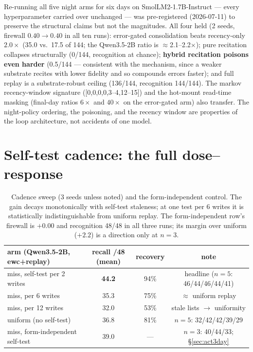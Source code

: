 \documentclass[11pt]{article}
\newcommand{\qwen}{Qwen3.5-2B}
\newcommand{\smol}{SmolLM2-1.7B-Instruct}
\begin{document}
Re-running all five night arms for six days on \smol{} --- every hyperparameter carried over
unchanged --- was pre-registered (2026-07-11) to preserve the structural claims but not the
magnitudes. All four held (2 seeds, firewall $0.40\to0.40$ in all ten runs): error-gated
consolidation beats recency-only $2.0\times$ (35.0 vs.\ 17.5 of 144; the \qwen{} ratio is
$\approx$2.1--2.2$\times$); pure recitation collapses structurally (0/144, recognition at chance);
\textbf{hybrid recitation poisons even harder} (0.5/144 --- consistent with the mechanism, since
a weaker substrate recites with lower fidelity and so compounds errors faster); and full replay
is a substrate-robust ceiling (136/144, recognition 144/144). The markov recency-window
signature ([0,0,0,0,3--4,12--15]) and the hot-mount read-time masking (final-day ratios
$6\times$ and $40\times$ on the
error-gated arm) also transfer. The night-policy ordering, the poisoning, and the recency window
are properties of the loop architecture, not accidents of one model.

\section{Self-test cadence: the full dose--response}\label{app:cadence}

\begin{table}[h]\centering\small
\setlength{\tabcolsep}{4.5pt}
\begin{tabular}{lccc}
\toprule
arm (\qwen{}, ewc+replay) & recall /48 (mean) & recovery & note \\
\midrule
miss, self-test per 2 writes & \textbf{44.2} & 94\% & headline ($n{=}5$: 46/44/46/44/41) \\
miss, per 6 writes           & 35.3 & 75\% & $\approx$ uniform replay \\
miss, per 12 writes          & 32.0 & 53\% & stale lists $\to$ uniformity \\
uniform (no self-test)       & 36.8 & 81\% & $n{=}5$: 32/42/42/39/29 \\
miss, form-independent self-test & 39.0 & --- & $n{=}3$: 40/44/33; \S\ref{sec:act3day} \\
\bottomrule
\end{tabular}
\caption{Cadence sweep (3 seeds unless noted) and the form-independent control. The gain decays
monotonically with self-test staleness; at one test per 6 writes it is statistically
indistinguishable from uniform replay. The form-independent row's firewall is $+0.00$ and
recognition 48/48 in all three runs; its margin over uniform ($+2.2$) is a direction only at
$n{=}3$.}
\label{tab:cadence}
\end{table}
\end{document}

